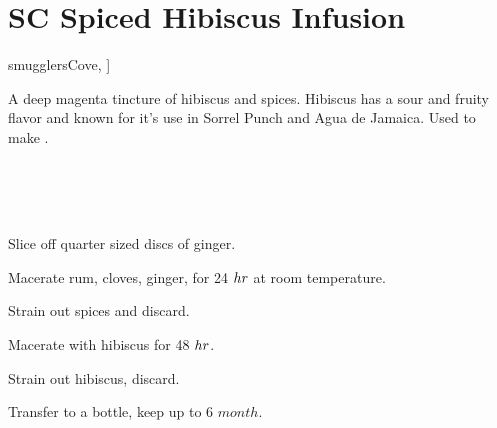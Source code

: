 \section[SC Hibiscus Infusion]{SC Spiced Hibiscus Infusion}\label{hibiscus_infusion}


\begin{recipestats}[
	servings=16~\fluidounce,
	preptime=5~\minute,
	inactivetime=72~\hour,
	original=\citeauthor{smugglersCove}~\cite[p.~331]{smugglersCove},
]
\end{recipestats}


\begin{recipeabstract}
	A deep magenta tincture of hibiscus and spices.
	Hibiscus has a sour and fruity flavor and known for it's use in Sorrel Punch and Agua de Jamaica.
	Used to make .
\end{recipeabstract}


\begin{ingredientcolumns}[1]
	\begin{ingredientblock}
		\\
		\\
		\\
	\end{ingredientblock}
\end{ingredientcolumns}


\begin{preparation}
\item Slice off quarter sized discs of ginger.
\item Macerate rum, cloves, ginger, for 24 $\hour$ at room temperature.
\item Strain out spices and discard.
\item Macerate with hibiscus for 48 $\hour$.
\item Strain out hibiscus, discard.
\item Transfer to a bottle, keep up to 6 $month$.
\end{preparation}


\recipeend%
